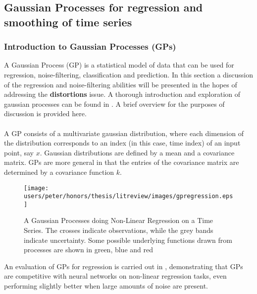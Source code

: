 	\subsection{Gaussian Processes for regression and smoothing of time series}
	\subsubsection{Introduction to Gaussian Processes (GPs)}
	A Gaussian Process (GP) is a statistical model of data that can be used for regression, noise-filtering, classification and prediction. In this section a discussion of the regression and noise-filtering abilities will be presented in the hopes of addressing the \textbf{distortions} issue. A thorough introduction and exploration of gaussian processes can be found in \citep{rasmussen2006gpfml}. A brief overview for the purposes of discussion is provided here.
	
	\paragraph{}
	A GP consists of a multivariate gaussian distribution, where each dimension of the distribution corresponds to an index (in this case, time index) of an input point, say $x$. Gaussian distributions are defined by a mean and a covariance matrix. GPs are more general in that the entries of the covariance matrix are determined by a covariance function $k$. 
	\begin{figure}[ht!]
	\centering
	\texttt{[image: users/peter/honors/thesis/litreview/images/gpregression.eps]}
	\label{fig:gaussianprocessregression}
	\caption{A Gaussian Processes doing Non-Linear Regression on a Time Series. The crosses indicate observations, while the grey bands indicate uncertainty. Some possible underlying functions drawn from processes are shown in green, blue and red}
	\end{figure}
		An evaluation of GPs for regression is carried out in \citep{rasmussen1996evaluation}, demonstrating that GPs are competitive with neural networks on non-linear regression tasks, even performing slightly better when large amounts of noise are present.
